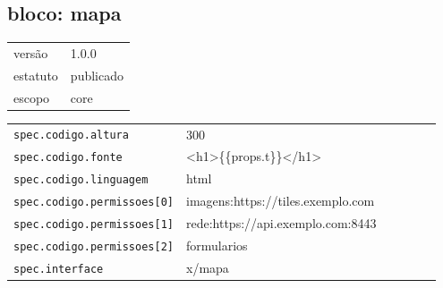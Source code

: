 \subsection*{bloco: mapa}
\begin{tabular}{@{}ll@{}}
versão & 1.0.0 \\
estatuto & publicado \\
escopo & core \\
\end{tabular}

\begin{tabular}{@{}p{0.35\linewidth}p{0.6\linewidth}@{}}
\texttt{spec.codigo.altura} & 300 \\
\texttt{spec.codigo.fonte} & <h1>\{\{props.t\}\}</h1> \\
\texttt{spec.codigo.linguagem} & html \\
\texttt{spec.codigo.permissoes[0]} & imagens:https://tiles.exemplo.com \\
\texttt{spec.codigo.permissoes[1]} & rede:https://api.exemplo.com:8443 \\
\texttt{spec.codigo.permissoes[2]} & formularios \\
\texttt{spec.interface} & x/mapa \\
\end{tabular}
